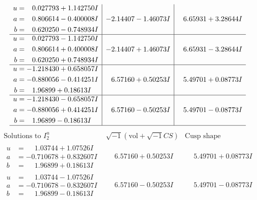 \documentclass[1p]{elsarticle_modified}
\theoremstyle{definition}
\newcommand{\I}{\sqrt{-1}}
\begin{document}
$$\begin{array}{c|c|c}
\begin{aligned}
u &= \phantom{-}0.027793 + 1.142750 I \\
a &= \phantom{-}0.806614 - 0.400008 I \\
b &= \phantom{-}0.620250 - 0.748934 I\end{aligned}
 & -2.14407 - 1.46073 I & \phantom{-}6.65931 + 3.28644 I \\ \hline\begin{aligned}
u &= \phantom{-}0.027793 - 1.142750 I \\
a &= \phantom{-}0.806614 + 0.400008 I \\
b &= \phantom{-}0.620250 + 0.748934 I\end{aligned}
 & -2.14407 + 1.46073 I & \phantom{-}6.65931 - 3.28644 I \\ \hline\begin{aligned}
u &= -1.218430 + 0.658057 I \\
a &= -0.880056 - 0.414251 I \\
b &= \phantom{-}1.96899 + 0.18613 I\end{aligned}
 & \phantom{-}6.57160 + 0.50253 I & \phantom{-}5.49701 + 0.08773 I \\ \hline\begin{aligned}
u &= -1.218430 - 0.658057 I \\
a &= -0.880056 + 0.414251 I \\
b &= \phantom{-}1.96899 - 0.18613 I\end{aligned}
 & \phantom{-}6.57160 - 0.50253 I & \phantom{-}5.49701 - 0.08773 I\\
 \hline 
 \end{array}$$\newpage$$\begin{array}{c|c|c}  
\text{Solutions to }I^u_{2}& \I (\text{vol} + \sqrt{-1}CS) & \text{Cusp shape}\\
 \hline 
\begin{aligned}
u &= \phantom{-}1.03744 + 1.07526 I \\
a &= -0.710678 + 0.832607 I \\
b &= \phantom{-}1.96899 + 0.18613 I\end{aligned}
 & \phantom{-}6.57160 + 0.50253 I & \phantom{-}5.49701 + 0.08773 I \\ \hline\begin{aligned}
u &= \phantom{-}1.03744 - 1.07526 I \\
a &= -0.710678 - 0.832607 I \\
b &= \phantom{-}1.96899 - 0.18613 I\end{aligned}
 & \phantom{-}6.57160 - 0.50253 I & \phantom{-}5.49701 - 0.08773 I \\ \hline\begin{aligned}

\end{aligned}
\end{array}$$
\end{document}
